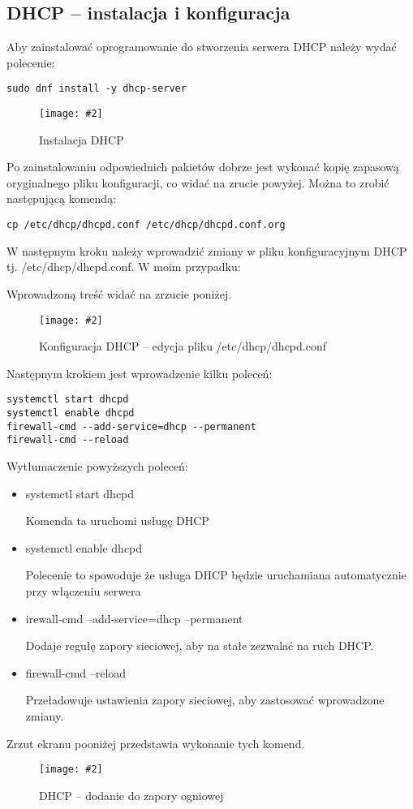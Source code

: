 \documentclass[a4paper]{article}
\newcommand*{\zdj}[2][\textwidth]{\texttt{[image: \#2]}}
\newcommand*{\fg}[4][!htb]{
      \begin{figure*}[#1]
            \zdj{#2}
            \caption[#4]{#3}
      \end{figure*}
}
\begin{document}
\subsection{DHCP – instalacja i konfiguracja}
Aby zainstalować oprogramowanie do stworzenia serwera DHCP należy wydać polecenie:

\vspace*{-5pt}
\begin{Verbatim}[frame=single]
sudo dnf install -y dhcp-server
\end{Verbatim}
\vspace*{-5pt}
\fg{contents/configuration/DHCP/1.png}{Instalacja DHCP}{Instalacja DHCP}
Po zainstalowaniu odpowiednich pakietów dobrze jest wykonać kopię zapasową oryginalnego pliku konfiguracji, co widać na zrucie powyżej. Można to zrobić następującą komendą:
\begin{Verbatim}[frame=single]
cp /etc/dhcp/dhcpd.conf /etc/dhcp/dhcpd.conf.org
\end{Verbatim}
\newpage
W następnym kroku należy wprowadzić zmiany w pliku konfiguracyjnym DHCP tj. /etc/dhcp/dhcpd.conf. W moim przypadku: 

Wprowadzoną treść widać na zrzucie poniżej. 
\fg{contents/configuration/DHCP/2.png}{Konfiguracja DHCP – edycja pliku /etc/dhcp/dhcpd.conf}{Konfiguracja DHCP}

\newpage
Następnym krokiem jest wprowadzenie kilku poleceń: 
\begin{Verbatim}[frame=single]
systemctl start dhcpd
systemctl enable dhcpd
firewall-cmd --add-service=dhcp --permanent
firewall-cmd --reload
\end{Verbatim}

Wytłumaczenie powyższych poleceń:
\begin{itemize}
\item systemctl start dhcpd

Komenda ta uruchomi usługę DHCP
\item systemctl enable dhcpd
 
Polecenie to spowoduje że usługa DHCP będzie uruchamiana automatycznie przy włączeniu serwera 
\item irewall-cmd --add-service=dhcp --permanent

Dodaje regułę zapory sieciowej, aby na stałe zezwalać na ruch DHCP.
\item firewall-cmd --reload

Przeładowuje ustawienia zapory sieciowej, aby zastosować wprowadzone zmiany.
\end{itemize}
Zrzut ekranu pooniżej przedstawia wykonanie tych komend.
\fg{contents/configuration/DHCP/3.png}{DHCP – dodanie do zapory ogniowej}{DHCP – dodanie do zapory ogniowej}
\end{document}
